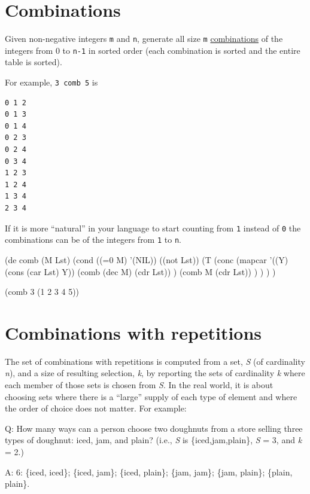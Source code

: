 \pagebreak{}
\section*{Combinations}

Given non-negative integers \texttt{m} and \texttt{n}, generate all
size \texttt{m}
\href{http://mathworld.wolfram.com/Combination.html}{combinations} of
the integers from 0 to \texttt{n-1} in sorted order (each combination
is sorted and the entire table is sorted).

For example, \texttt{3 comb 5} is

\begin{verbatim}
0 1 2
0 1 3
0 1 4
0 2 3
0 2 4
0 3 4
1 2 3
1 2 4
1 3 4
2 3 4
\end{verbatim}

If it is more ``natural'' in your language to start counting from
\texttt{1} instead of \texttt{0} the combinations can be of the integers
from \texttt{1} to \texttt{n}.


\begin{wideverbatim}

(de comb (M Lst)
   (cond
      ((=0 M) '(NIL))
      ((not Lst))
      (T
         (conc
            (mapcar
               '((Y) (cons (car Lst) Y))
               (comb (dec M) (cdr Lst)) )
            (comb M (cdr Lst)) ) ) ) )

(comb 3 (1 2 3 4 5))

\end{wideverbatim}

\pagebreak{}
\section*{Combinations with repetitions}

The set of combinations with repetitions is computed from a set,
\emph{S} (of cardinality \emph{n}), and a size of resulting selection,
\emph{k}, by reporting the sets of cardinality \emph{k} where each
member of those sets is chosen from \emph{S}. In the real world, it is
about choosing sets where there is a ``large'' supply of each type of
element and where the order of choice does not matter. For example:

Q: How many ways can a person choose two doughnuts from a store selling
three types of doughnut: iced, jam, and plain? (i.e., \emph{S} is
\{iced,jam,plain\}, \textbar{} \emph{S} \textbar{} = 3, and \emph{k} =
2.)

A: 6: \{iced, iced\}; \{iced, jam\}; \{iced, plain\}; \{jam, jam\};
\{jam, plain\}; \{plain, plain\}.

